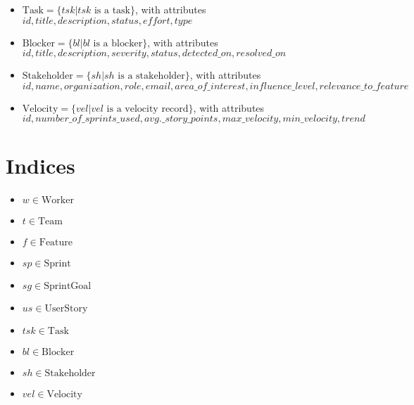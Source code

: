 \documentclass[11pt]{article}
\begin{document}
\begin{itemize}
    \item $\text{Task} = \{tsk | tsk \text{ is a task}\}$, with attributes $id, title, description, status, effort, type$
    \item $\text{Blocker} = \{bl | bl \text{ is a blocker}\}$, with attributes $id, title, description, severity, status, detected\_on, resolved\_on$
    \item $\text{Stakeholder} = \{sh | sh \text{ is a stakeholder}\}$, with attributes $id, name, organization, role, email, area\_of\_interest, influence\_level, relevance\_to\_feature$
    \item $\text{Velocity} = \{vel | vel \text{ is a velocity record}\}$, with attributes $id, number\_of\_sprints\_used, avg.\_story\_points, max\_velocity, min\_velocity, trend$
\end{itemize}

\section{Indices}
\begin{itemize}
    \item $w \in \text{Worker}$
    \item $t \in \text{Team}$
    \item $f \in \text{Feature}$
    \item $sp \in \text{Sprint}$
    \item $sg \in \text{SprintGoal}$
    \item $us \in \text{UserStory}$
    \item $tsk \in \text{Task}$
    \item $bl \in \text{Blocker}$
    \item $sh \in \text{Stakeholder}$
    \item $vel \in \text{Velocity}$
\end{itemize}
\end{document}
